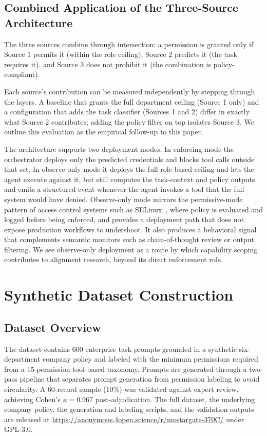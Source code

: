 \documentclass{article}
\theoremstyle{plain}
\theoremstyle{definition}
\theoremstyle{remark}
\begin{document}
\subsection{Combined Application of the Three-Source Architecture}
The three sources combine through intersection: a permission is granted 
only if Source 1 permits it (within the role ceiling), Source 2 predicts 
it (the task requires it), and Source 3 does not prohibit it (the 
combination is policy-compliant).

Each source's contribution can be measured independently by stepping 
through the layers. A baseline that grants the full department ceiling 
(Source 1 only) and a configuration that adds the task classifier 
(Sources 1 and 2) differ in exactly what Source 2 contributes; adding 
the policy filter on top isolates Source 3. We outline this evaluation 
as the empirical follow-up to this paper.

The architecture supports two deployment modes. In enforcing mode the 
orchestrator deploys only the predicted credentials and blocks tool calls 
outside that set. In observe-only mode it deploys the full role-based 
ceiling and lets the agent execute against it, but still computes the 
task-context and policy outputs and emits a structured event whenever 
the agent invokes a tool that the full system would have denied. 
Observe-only mode mirrors the permissive-mode pattern of access control 
systems such as SELinux~\citep{smalley2001selinux}, where policy is 
evaluated and logged before being enforced, and provides a deployment 
path that does not expose production workflows to undershoot. It also produces a behavioral signal that complements semantic monitors such as chain-of-thought review or output filtering. We see observe-only deployment as a route by which capability scoping contributes to alignment research, beyond its direct enforcement role.

\section{Synthetic Dataset Construction}
\subsection{Dataset Overview}
The dataset contains 600 enterprise task prompts grounded in a synthetic 
six-department company policy and labeled with the minimum permissions 
required from a 15-permission tool-based taxonomy. Prompts are generated 
through a two-pass pipeline that separates prompt generation from 
permission labeling to avoid circularity. A 60-record sample (10\%) was 
validated against expert review, achieving Cohen's $\kappa = 0.967$ 
post-adjudication. The full dataset, the underlying company policy, the 
generation and labeling scripts, and the validation outputs are released 
at \url{https://anonymous.4open.science/r/mostargate-370C/} under GPL-3.0.
\end{document}
